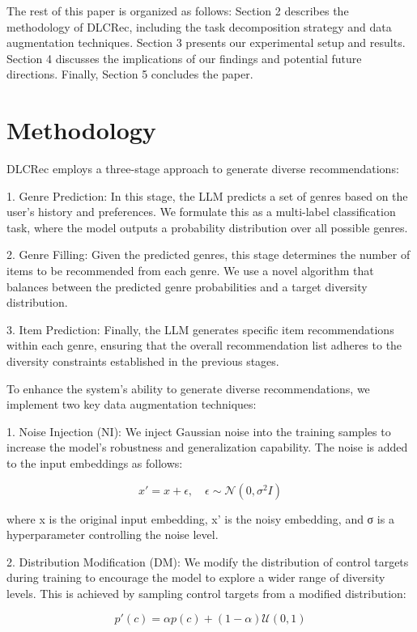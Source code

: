\documentclass[10pt,twocolumn,letterpaper]{article}
\begin{document}
The rest of this paper is organized as follows: Section 2 describes the methodology of DLCRec, including the task decomposition strategy and data augmentation techniques. Section 3 presents our experimental setup and results. Section 4 discusses the implications of our findings and potential future directions. Finally, Section 5 concludes the paper.

\section{Methodology}

DLCRec employs a three-stage approach to generate diverse recommendations:

1. Genre Prediction: In this stage, the LLM predicts a set of genres based on the user's history and preferences. We formulate this as a multi-label classification task, where the model outputs a probability distribution over all possible genres.

2. Genre Filling: Given the predicted genres, this stage determines the number of items to be recommended from each genre. We use a novel algorithm that balances between the predicted genre probabilities and a target diversity distribution.

3. Item Prediction: Finally, the LLM generates specific item recommendations within each genre, ensuring that the overall recommendation list adheres to the diversity constraints established in the previous stages.

To enhance the system's ability to generate diverse recommendations, we implement two key data augmentation techniques:

1. Noise Injection (NI): We inject Gaussian noise into the training samples to increase the model's robustness and generalization capability. The noise is added to the input embeddings as follows:

   \[ x' = x + \epsilon, \quad \epsilon \sim \mathcal{N}(0, \sigma^2I) \]

where x is the original input embedding, x' is the noisy embedding, and σ is a hyperparameter controlling the noise level.

2. Distribution Modification (DM): We modify the distribution of control targets during training to encourage the model to explore a wider range of diversity levels. This is achieved by sampling control targets from a modified distribution:

   \[ p'(c) = \alpha p(c) + (1-\alpha)\mathcal{U}(0,1) \]
\end{document}
